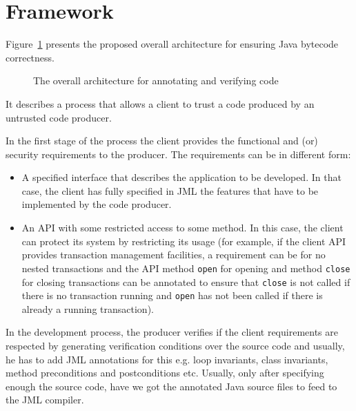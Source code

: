 \section{Framework}
\label{architecture_s}	
Figure~\ref{architecture} presents the proposed overall architecture for ensuring Java bytecode correctness. 
\begin{figure}[ht!]
\begin{center}
\caption{The overall architecture for annotating and verifying code}
\label{architecture}
\end{center}
\end{figure}
It describes a process that allows a client to trust a code produced by an untrusted code producer.

In the first stage of the process the client provides the functional and (or) security requirements to the producer. The requirements can be in different form:
\begin{itemize}
\item A specified interface that describes the application to be developed. In that case, the client has fully specified in JML the features that have to be implemented by the code producer.
\item An API with some restricted access to some method. In this case, the client can protect its system by restricting its usage (for example, if the client API provides transaction management facilities, a requirement can be for no nested transactions and the API method \texttt{open} for opening and method \texttt{close} for closing transactions can be annotated to ensure that \texttt{close} is not called if there is no transaction running and \texttt{open} has not been called if there is already a running transaction).   
\end{itemize}


In the development process, the producer verifies if the client requirements are respected by generating verification conditions
over the source code and usually, he has to add JML annotations for this e.g. loop invariants, class invariants, method preconditions
 and postconditions etc. Usually, only after specifying enough the source code, 
have we got the annotated Java source files to feed to the JML compiler.



